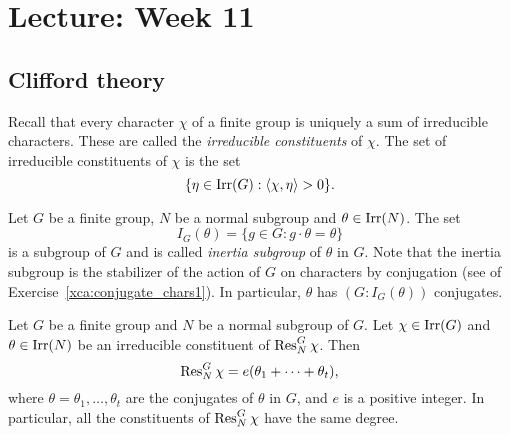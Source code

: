 \section{Lecture: Week 11}

\subsection{Clifford theory}


Recall that every character $\chi$ of a finite group is uniquely 
a sum of irreducible characters. These are called
the \emph{irreducible constituents} of $\chi$. The set 
of irreducible constituents of $\chi$ is the set  
\[
\{\eta\in\operatorname{Irr}(G):\langle\chi,\eta\rangle>0\}.
\]

Let $G$ be a finite group, $N$ be a normal subgroup 
and $\theta\in\operatorname{Irr}(N)$. The set 
\[
I_G(\theta)=\{g\in G:g\cdot\theta=\theta\}
\]
is a subgroup of $G$ and is called \emph{inertia subgroup} of $\theta$ in $G$. Note that the inertia
subgroup is the stabilizer of the action of $G$ 
on characters by conjugation (see 
of Exercise~\ref{xca:conjugate_chars1}). In particular, 
$\theta$ has 
$(G:I_G(\theta))$ conjugates. 

\begin{theorem}[Clifford]
\label{thm:Clifford}
    Let $G$ be a finite group and $N$ be a normal
    subgroup of $G$. Let $\chi\in\operatorname{Irr}(G)$ and $\theta\in\operatorname{Irr}(N)$ be 
    an irreducible constituent of $\operatorname{Res}_N^G\chi$. 
    Then 
    \[
    \operatorname{Res}_N^G\chi = e(\theta_1+\cdots+\theta_t),
    \]
    where $\theta=\theta_1,\dots,\theta_t$ are the conjugates 
    of $\theta$ in $G$, 
    and $e$ is a positive integer. In particular, all the constituents of $\operatorname{Res}_N^G\chi$ have the same degree. 
\end{theorem}


